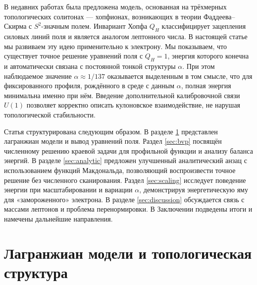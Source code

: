 \documentclass[12pt]{article}
\begin{document}
В недавних работах \cite{Faddeev1997,Battye2006} была предложена модель, основанная на трёхмерных топологических солитонах --- хопфионах, возникающих в теории Фаддеева--Скирма с $S^2$-значным полем. Инвариант Хопфа $Q_H$ классифицирует зацепления силовых линий поля и является аналогом лептонного числа. В настоящей статье мы развиваем эту идею применительно к электрону. Мы показываем, что существует точное решение уравнений поля с $Q_H=1$, энергия которого конечна и автоматически связана с постоянной тонкой структуры $\alpha$. При этом наблюдаемое значение $\alpha\approx1/137$ оказывается выделенным в том смысле, что для фиксированного профиля, рождённого в среде с данным $\alpha$, полная энергия минимальна именно при нём. Введение дополнительной калибровочной связи $U(1)$ позволяет корректно описать кулоновское взаимодействие, не нарушая топологической стабильности.

Статья структурирована следующим образом. В разделе \ref{sec:model} представлен лагранжиан модели и вывод уравнений поля. Раздел \ref{sec:bvp} посвящён численному решению краевой задачи для профильной функции и анализу баланса энергий. В разделе \ref{sec:analytic} предложен улучшенный аналитический анзац с использованием функций Макдональда, позволяющий воспроизвести точное решение без численного сканирования. Раздел \ref{sec:scaling} исследует поведение энергии при масштабировании и вариации $\alpha$, демонстрируя энергетическую яму для «замороженного» электрона. В разделе \ref{sec:discussion} обсуждается связь с массами лептонов и проблема перенормировки. В Заключении подведены итоги и намечены дальнейшие направления.

\section{Лагранжиан модели и топологическая структура}
\label{sec:model}
\end{document}
